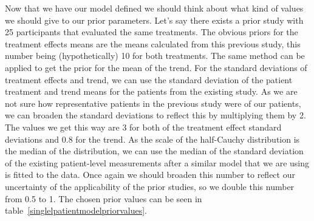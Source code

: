 \documentclass[12pt,a4paper,leqno]{report}
\theoremstyle{plain}
\theoremstyle{definition}
\theoremstyle{remark}
\begin{document}
\bigskip
{}
\bigskip

Now that we have our model defined we should think about what kind of values we should
give to our prior parameters. Let's say there exists a prior study with 25 participants
that evaluated the same treatments. The obvious priors for the treatment effects means
are the means calculated from this previous study, this number being (hypothetically) 10 for both
treatments. The same method can be applied to get the prior for the mean of the trend. For
the standard deviations of treatment effects and trend, we can use the standard deviation
of the patient treatment and trend means for the patients from the existing study. As we
are not sure how representative patients in the previous study were of our patients, we
can broaden the standard deviations to reflect this by multiplying them by 2. The values
we get this way are 3 for both of the treatment effect standard deviations and 0.8 for
the trend. As the scale of the half-Cauchy
distribution is the median of the distribution, we can use the median of
the standard deviation of the existing patient-level measurements after a similar model that we
are using is fitted to the data. Once again we should broaden this number to reflect our uncertainty of the
applicability of the prior studies, so we double this number from 0.5 to 1.
The chosen prior values can be seen in table\ \ref{singlelpatientmodelpriorvalues}.
\end{document}
